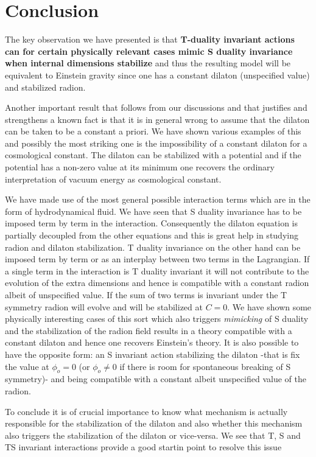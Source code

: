 \documentclass[aps,floatfix,twocolumn,amsmath]{revtex4}
\begin{document}
\section{Conclusion}

The key observation we have presented is that {\bf T-duality invariant actions can for certain physically relevant cases mimic S duality invariance when internal dimensions stabilize} and thus the resulting model will be equivalent to Einstein gravity since one has a constant dilaton (unspecified value) and stabilized radion.

Another important result that follows from our discussions and that justifies and strengthens a known fact is that it is in general wrong to assume that the dilaton can be taken to
be a constant a priori. We have shown various examples of this and possibly the most striking one is the impossibility of a constant dilaton for a cosmological constant. The dilaton can be stabilized with a potential and if the potential has a non-zero value at its minimum one recovers the ordinary interpretation of vacuum energy as cosmological constant.



We have made use of the most general possible interaction terms which are in the form of hydrodynamical fluid. We have seen that S duality invariance has to be imposed term by term in the interaction. Consequently the dilaton equation is partially decoupled from the other equations and this is great help in studying radion and dilaton stabilization. T duality invariance on the other hand can be imposed term by term or as an interplay between two terms in the Lagrangian. If a single term in the interaction is T duality invariant it will not
contribute to the evolution of the extra dimensions and hence is compatible with a constant radion albeit of unspecified value. If the sum of two terms is invariant under the T symmetry radion will evolve and will be stabilized at $C=0$. We have shown some physically interesting cases of this sort which also triggers {\em mimicking} of S duality and the stabilization of the radion field results in a theory compatible with a constant dilaton and hence one recovers Einstein's theory. It is also possible to have the opposite form: an S invariant action stabilizing the dilaton -that is fix the value at $\phi_{o}=0$ (or $\phi_{o}\neq0$ if there is room for spontaneous breaking of S symmetry)- and being compatible with a constant albeit unspecified value of the radion. 

To conclude it is of crucial importance to know what mechanism is actually responsible for the stabilization of the dilaton and also whether this mechanism also triggers the stabilization of the dilaton or vice-versa. We see that T, S and TS invariant interactions provide a good startin point to resolve this issue
\end{document}
